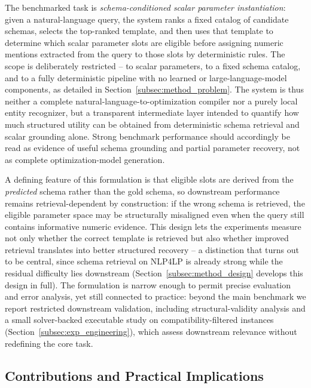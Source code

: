 \documentclass[pdflatex,sn-basic,Numbered]{sn-jnl}
\begin{document}
The benchmarked task is \emph{schema-conditioned scalar parameter instantiation}: given a natural-language query, the system ranks a fixed catalog of candidate schemas, selects the top-ranked template, and then uses that template to determine which scalar parameter slots are eligible before assigning numeric mentions extracted from the query to those slots by deterministic rules. The scope is deliberately restricted -- to scalar parameters, to a fixed schema catalog, and to a fully deterministic pipeline with no learned or large-language-model components, as detailed in Section~\ref{subsec:method_problem}. The system is thus neither a complete natural-language-to-optimization compiler nor a purely local entity recognizer, but a transparent intermediate layer intended to quantify how much structured utility can be obtained from deterministic schema retrieval and scalar grounding alone. Strong benchmark performance should accordingly be read as evidence of useful schema grounding and partial parameter recovery, not as complete optimization-model generation.

A defining feature of this formulation is that eligible slots are derived from the \emph{predicted} schema rather than the gold schema, so downstream performance remains retrieval-dependent by construction: if the wrong schema is retrieved, the eligible parameter space may be structurally misaligned even when the query still contains informative numeric evidence. This design lets the experiments measure not only whether the correct template is retrieved but also whether improved retrieval translates into better structured recovery -- a distinction that turns out to be central, since schema retrieval on \textsc{NLP4LP} is already strong while the residual difficulty lies downstream (Section~\ref{subsec:method_design} develops this design in full). The formulation is narrow enough to permit precise evaluation and error analysis, yet still connected to practice: beyond the main benchmark we report restricted downstream validation, including structural-validity analysis and a small solver-backed executable study on compatibility-filtered instances (Section~\ref{subsec:exp_engineering}), which assess downstream relevance without redefining the core task.

\subsection{Contributions and Practical Implications}
\label{subsec:intro_contributions}
\end{document}
